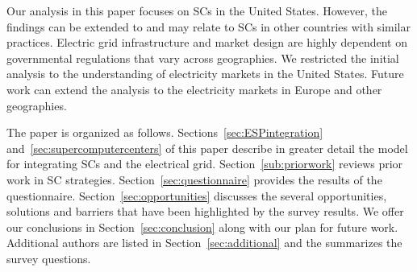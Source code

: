 Our analysis in this paper focuses %
on SCs in the United States. However, 
the findings can be extended to and may relate to SCs in other countries with similar practices. 
Electric grid infrastructure and market design are highly dependent on %
governmental regulations that vary across geographies. We restricted the initial analysis to the understanding of 
electricity markets in the United States. Future work can extend the analysis to the electricity markets in Europe and other geographies.

The paper is organized as follows.
Sections~\ref{sec:ESPintegration} and~\ref{sec:supercomputercenters} of this paper
describe in greater detail the model for 
integrating SCs and the electrical grid.
Section~\ref{sub:priorwork}
reviews prior work in SC strategies. %
Section~\ref{sec:questionnaire} provides the results of the questionnaire. 
Section~\ref{sec:opportunities} 
discusses the several opportunities, solutions and barriers that have been highlighted
by the survey results. We offer our conclusions in Section~\ref{sec:conclusion} along with our plan for future work. Additional authors are listed in Section~\ref{sec:additional} and the  summarizes the survey questions.
